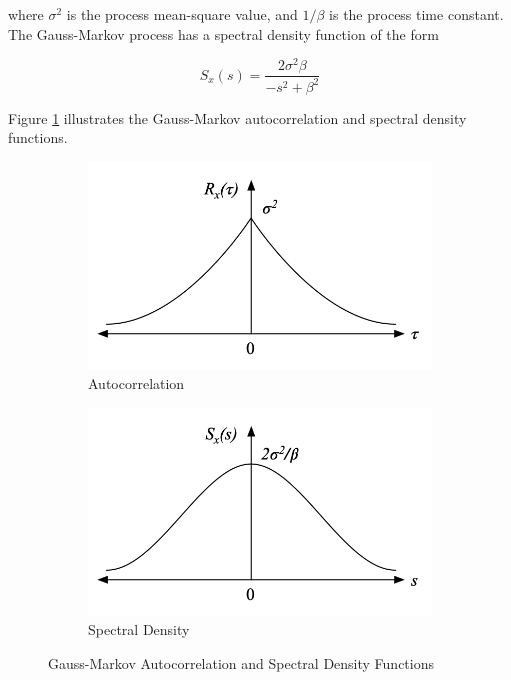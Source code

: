 \documentclass[12pt]{article}
\begin{document}
where $\sigma^2$ is the process mean-square value, and $1 / \beta$ is the process time
constant. The Gauss-Markov process has a spectral density function of the form

\begin{equation}
    S_x(s) = \frac{2 \sigma^2 \beta}{-s^2 + \beta^2}
    \label{eq:GM-spectral-function}
\end{equation}

Figure \ref{fig:GM-characteristics} illustrates the Gauss-Markov autocorrelation
and spectral density functions.

\begin{figure}[ht]
    \centering
    \begin{subfigure}{0.49\textwidth}
        \includegraphics[width=\textwidth]{GM-Autocorrelation.png}
        \caption{Autocorrelation}
    \end{subfigure}
    \begin{subfigure}{0.49\textwidth}
        \includegraphics[width=\textwidth]{GM-Spectral-Density.png}
        \caption{Spectral Density}
    \end{subfigure}
    \caption{Gauss-Markov Autocorrelation and Spectral Density Functions}
    \label{fig:GM-characteristics}
\end{figure}
\end{document}
